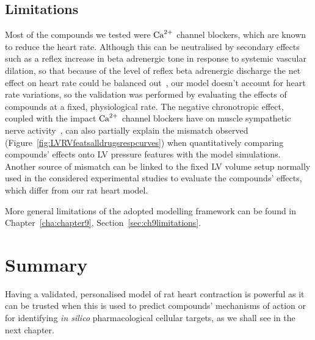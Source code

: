 %
%
%
\subsection{Limitations}\label{sec:ch6limitations}
Most of the compounds we tested were $\textrm{Ca}^{2+}$ channel blockers, which are known to reduce the heart rate. Although this can be neutralised by secondary effects such as a reflex increase in beta adrenergic tone in response to systemic vascular dilation, so that because of the level of reflex beta adrenergic discharge the net effect on heart rate could be balanced out~\cite{Low:1982}, our model doesn't account for heart rate variations, so the validation was performed by evaluating the effects of compounds at a fixed, physiological rate. The negative chronotropic effect, coupled with the impact $\textrm{Ca}^{2+}$ channel blockers have on muscle sympathetic nerve activity~\cite{Binggeli:2002}, can also partially explain the mismatch observed (Figure~\ref{fig:LVRVfeatsalldrugsrespcurves}) when quantitatively comparing compounds' effects onto LV pressure features with the model simulations. Another source of mismatch can be linked to the fixed LV volume setup normally used in the considered experimental studies to evaluate the compounds' effects, which differ from our rat heart model.

\vspace{0.2cm}
More general limitations of the adopted modelling framework can be found in Chapter~\ref{cha:chapter9}, Section~\ref{sec:ch9limitations}.


%
%
%
\section{Summary}\label{sec:ch6summary}
Having a validated, personalised model of rat heart contraction is powerful as it can be trusted when this is used to predict compounds' mechanisms of action or for identifying \textit{in silico} pharmacological cellular targets, as we shall see in the next chapter.